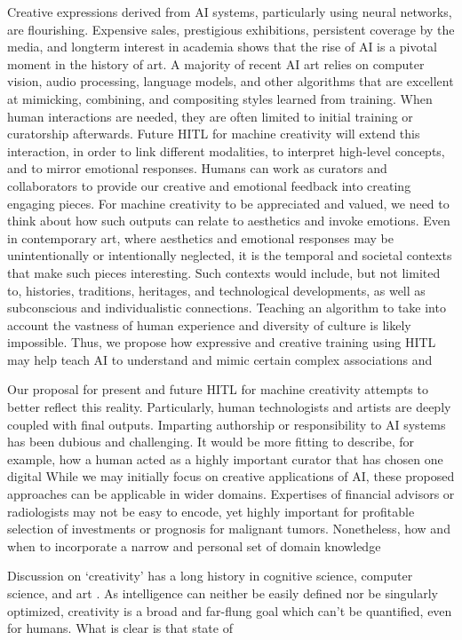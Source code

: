 \documentclass[letterpaper]{article} %
\begin{document}
Creative expressions derived from AI systems, particularly using neural networks, are flourishing. Expensive sales, prestigious exhibitions, persistent coverage by the media, and longterm interest in academia shows that the rise of AI is a pivotal moment in the history of art. A majority of recent AI art relies on computer vision, audio processing, language models, and other algorithms that are excellent at mimicking, combining, and compositing styles learned from training. When human interactions are needed, they are often limited to initial training or curatorship afterwards. Future HITL for machine creativity will extend this interaction, in order to link different modalities, to interpret high-level concepts, and to mirror emotional responses. Humans can work as curators and collaborators to provide our creative and emotional feedback into creating engaging pieces.  For machine creativity to be appreciated and valued, we need to think about how such outputs can relate to aesthetics and invoke emotions. Even in contemporary art, where aesthetics and emotional responses may be unintentionally or intentionally neglected, it is the temporal and societal contexts that make such pieces interesting. Such contexts would include, but not limited to, histories, traditions, heritages, and technological developments, as well as subconscious and individualistic connections. Teaching an algorithm to take into account the vastness of human experience and diversity of culture is likely impossible. Thus, we propose how expressive and creative training using HITL may help teach AI to understand and mimic certain complex associations and

Our proposal for present and future HITL for machine creativity attempts to better reflect this reality. Particularly, human technologists and artists are deeply coupled with final outputs. Imparting authorship or responsibility to AI systems has been dubious and challenging. It would be more fitting to describe, for example, how a human acted as a highly important curator that has chosen one digital  While we may initially focus on creative applications of AI, these proposed approaches can be applicable in wider domains. Expertises of financial advisors or radiologists may not be easy to encode, yet highly important for profitable selection of investments or prognosis for malignant tumors. Nonetheless, how and when to incorporate a narrow and personal set of domain knowledge

Discussion on `creativity' has a long history in cognitive science, computer science, and art \cite[e.g.,][]{Cohen1979, Wilson1983, Boden1996, Nake1998}. As intelligence can neither be easily defined nor be singularly optimized, creativity is a broad and far-flung goal which can't be quantified, even for humans. What is clear is that state of

\clearpage

\end{document}
